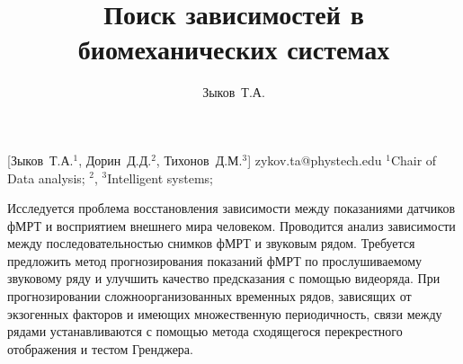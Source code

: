 \documentclass[12pt, twoside]{article}
\begin{document}
\title
    [Поиск зависимостей в биомеханических системах] %
    {Поиск зависимостей в биомеханических системах}
\author
    [Зыков Т.А.] %
    {Зыков~Т.А.} %
    [Зыков~Т.А.$^1$, Дорин~Д.Д.$^2$, Тихонов~Д.М.$^{3}$] %
\email
    {zykov.ta@phystech.edu}
\organization
    {$^1$Chair of Data analysis; $^2$, $^3$Intelligent systems;}
\abstract
    {%

    
   Исследуется проблема восстановления зависимости между показаниями датчиков фМРТ и восприятием внешнего мира человеком. Проводится анализ зависимости между последовательностью снимков фМРТ и звуковым рядом. Требуется предложить метод прогнозирования показаний фМРТ по прослушиваемому звуковому ряду и улучшить качество предсказания с помощью видеоряда. При прогнозировании сложноорганизованных временных рядов, зависящих от экзогенных факторов и имеющих множественную периодичность, связи между рядами устанавливаются с помощью метода сходящегося перекрестного отображения и тестом Гренджера. 
    
	
	
 	
	
}
\end{document}
